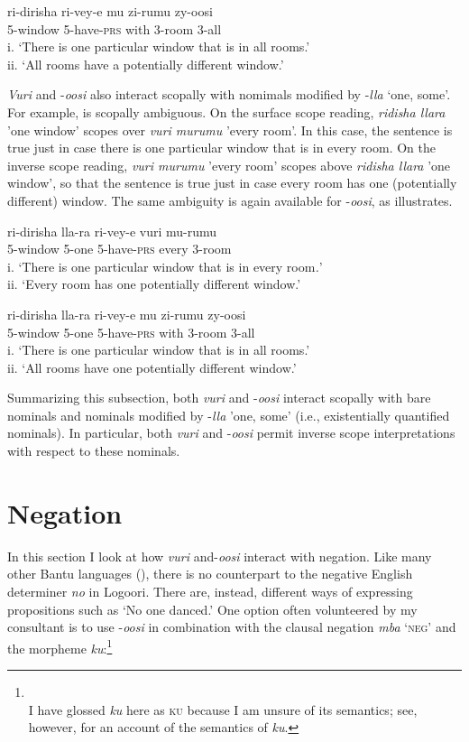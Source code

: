 \documentclass[output=paper]{langsci/langscibook}
\begin{document}
\ea
\gll ri-dirisha  ri-vey-e  mu  zi-rumu  zy-oosi\\
     5-window  5-have-\textsc{prs}  with  3-room  3-all\\
\glt i. ‘There is one particular window that is in all rooms.’ \\
ii. ‘All rooms have a potentially different window.’        
\z

\textit{Vuri} and -\textit{oosi} also interact scopally with nomimals modified by -\textit{lla} ‘one, some’. For example,  is scopally ambiguous. On the surface scope reading, \textit{ridisha llara} 'one window' scopes over \textit{vuri murumu} 'every room'. In this case, the sentence is true just in case there is one particular window that is in every room. On the inverse scope reading, \textit{vuri murumu} 'every room' scopes above \textit{ridisha llara} 'one window', so that the sentence is true just in case every room has one (potentially different) window. The same ambiguity is again available for -\textit{oosi}, as  illustrates.

\ea 
\gll ri-dirisha     lla-ra  ri-vey-e  vuri  mu-rumu  \\
     5-window   5-one  5-have-\textsc{prs}  every  3-room\\
\glt i. ‘There is one particular window that is in every room\textit{.}’  \\
ii. ‘Every room has one potentially different window.’        
\z

\ea
\gll ri-dirisha   lla-ra   ri-vey-e         mu     zi-rumu  zy-oosi\\
     5-window  5-one   5-have-\textsc{prs}    with   3-room  3-all\\
\glt i. ‘There is one particular window that is in all rooms.’ \\
ii. ‘All rooms have one potentially different window.’    \textsc{}  
\z

Summarizing this subsection, both \textit{vuri} and -\textit{oosi} interact scopally with bare nominals and nominals modified by -\textit{lla} 'one, some' (i.e., existentially quantified nominals). In particular, both \textit{vuri} and -\textit{oosi} permit inverse scope interpretations with respect to these nominals.

\section{Negation}

In this section I look at how \textit{vuri} and-\textit{oosi} interact with negation. Like many other Bantu languages (\citealt{ZerbianKrifka2008}), there is no counterpart to the negative English determiner \textit{no} in Logoori. There are, instead, different ways of expressing propositions such as ‘No one danced.’ One option often volunteered by my consultant is to use -\textit{oosi} in combination with the clausal negation \textit{mba} ‘\textsc{neg}’ and the morpheme \textit{ku}:\footnote{\\
 I have glossed \textit{ku} here as \textsc{ku} because I am unsure of its semantics; see, however, \citet{BowlerGluckman2015} for an account of the semantics of \textit{ku}.}
\end{document}
